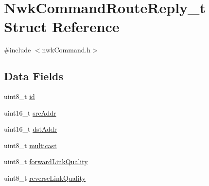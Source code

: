 \hypertarget{struct_nwk_command_route_reply__t}{\section{Nwk\-Command\-Route\-Reply\-\_\-t Struct Reference}
\label{struct_nwk_command_route_reply__t}
}


{\ttfamily \#include $<$nwk\-Command.\-h$>$}

\subsection*{Data Fields}
\begin{DoxyCompactItemize}
\item 
uint8\-\_\-t \hyperlink{struct_nwk_command_route_reply__t_a5a5dd0d65c52573b45b5f64fd2833d66}{id}
\item 
uint16\-\_\-t \hyperlink{struct_nwk_command_route_reply__t_a2fe52bcf86d394d11af8cfdcda481c12}{src\-Addr}
\item 
uint16\-\_\-t \hyperlink{struct_nwk_command_route_reply__t_a278ee8f3e8101e8f8c012986085d96b9}{dst\-Addr}
\item 
uint8\-\_\-t \hyperlink{struct_nwk_command_route_reply__t_a4dd17fd5afe5333f85ab6b061be7116f}{multicast}
\item 
uint8\-\_\-t \hyperlink{struct_nwk_command_route_reply__t_a97749919a31cea60151be87f82784298}{forward\-Link\-Quality}
\item 
uint8\-\_\-t \hyperlink{struct_nwk_command_route_reply__t_a81f136b1386c5586b3a28be64c465a2e}{reverse\-Link\-Quality}
\end{DoxyCompactItemize}


